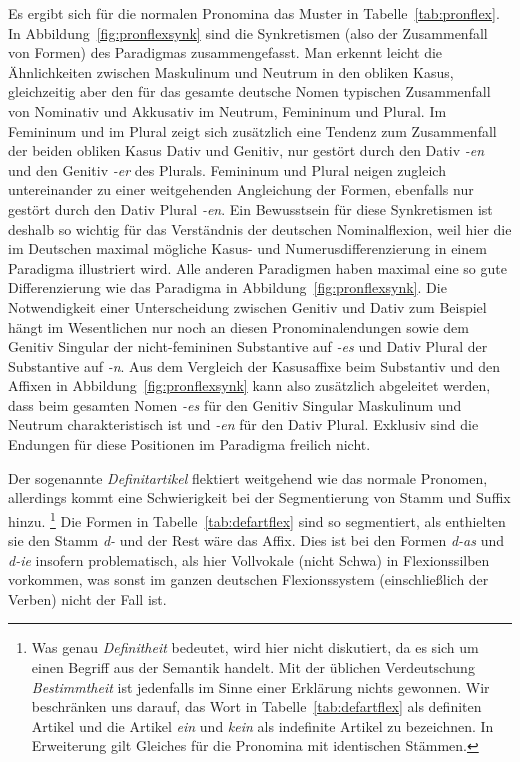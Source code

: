 Es ergibt sich für die normalen Pronomina das Muster in Tabelle~\ref{tab:pronflex}.
In Abbildung~\ref{fig:pronflexsynk} sind die Synkretismen (also der Zusammenfall von Formen) des Paradigmas zusammengefasst.
Man erkennt leicht die Ähnlichkeiten zwischen Maskulinum und Neutrum in den obliken Kasus, gleichzeitig aber den für das gesamte deutsche Nomen typischen Zusammenfall von Nominativ und Akkusativ im Neutrum, Femininum und Plural.
Im Femininum und im Plural zeigt sich zusätzlich eine Tendenz zum Zusammenfall der beiden obliken Kasus Dativ und Genitiv, nur gestört durch den Dativ \textit{-en} und den Genitiv \textit{-er} des Plurals.
Femininum und Plural neigen zugleich untereinander zu einer weitgehenden Angleichung der Formen, ebenfalls nur gestört durch den Dativ Plural \textit{-en}.
Ein Bewusstsein für diese Synkretismen ist deshalb so wichtig für das Verständnis der deutschen Nominalflexion, weil hier die im Deutschen maximal mögliche Kasus- und Numerusdifferenzierung in einem Paradigma illustriert wird.
Alle anderen Paradigmen haben maximal eine so gute Differenzierung wie das Paradigma in Abbildung~\ref{fig:pronflexsynk}.
Die Notwendigkeit einer Unterscheidung zwischen Genitiv und Dativ zum Beispiel hängt im Wesentlichen nur noch an diesen Pronominalendungen sowie dem Genitiv Singular der nicht-femininen Substantive auf \textit{-es} und Dativ Plural der Substantive auf \textit{-n}.
Aus dem Vergleich der Kasusaffixe beim Substantiv und den Affixen in Abbildung~\ref{fig:pronflexsynk} kann also zusätzlich abgeleitet werden, dass beim gesamten Nomen \textit{-es} für den Genitiv Singular Maskulinum und Neutrum charakteristisch ist und \textit{-en} für den Dativ Plural.
Exklusiv sind die Endungen für diese Positionen im Paradigma freilich nicht.


Der sogenannte \textit{Definitartikel} flektiert weitgehend wie das normale Pronomen, allerdings kommt eine Schwierigkeit bei der Segmentierung von Stamm und Suffix hinzu.%
\footnote{Was genau \textit{Definitheit} bedeutet, wird hier nicht diskutiert, da es sich um einen Begriff aus der Semantik handelt.
Mit der üblichen Verdeutschung \textit{Bestimmtheit} ist jedenfalls im Sinne einer Erklärung nichts gewonnen.
Wir beschränken uns darauf, das Wort in Tabelle~\ref{tab:defartflex} als definiten Artikel und die Artikel \textit{ein} und \textit{kein} als indefinite Artikel zu bezeichnen.
In Erweiterung gilt Gleiches für die Pronomina mit identischen Stämmen.}
Die Formen in Tabelle~\ref{tab:defartflex} sind so segmentiert, als enthielten sie den Stamm \textit{d-} und der Rest wäre das Affix.
Dies ist bei den Formen \textit{d-as} und \textit{d-ie} insofern problematisch, als hier Vollvokale (nicht Schwa) in Flexionssilben vorkommen, was sonst im ganzen deutschen Flexionssystem (einschließlich der Verben) nicht der Fall ist.

